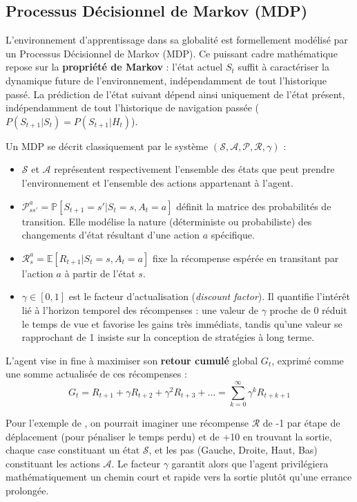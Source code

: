 \subsection{Processus Décisionnel de Markov (MDP)}
\label{sec:mdp}

L'environnement d'apprentissage dans sa globalité est formellement modélisé par un Processus Décisionnel de Markov (MDP). Ce puissant cadre mathématique repose sur la \textbf{propriété de Markov} : l'état actuel $S_t$ suffit à caractériser la dynamique future de l'environnement, indépendamment de tout l'historique passé. La prédiction de l'état suivant dépend ainsi uniquement de l'état présent, indépendamment de tout l'historique de navigation passée ($P(S_{t+1}|S_t) = P(S_{t+1}|H_t)$).

Un MDP se décrit classiquement par le système $(\mathcal{S}, \mathcal{A}, \mathcal{P}, \mathcal{R}, \gamma)$ :
\begin{itemize}
    \item $\mathcal{S}$ et $\mathcal{A}$ représentent respectivement l'ensemble des états que peut prendre l'environnement et l'ensemble des actions appartenant à l'agent.
    \item $\mathcal{P}_{ss'}^a = \mathbb{P}[S_{t+1}=s' | S_t=s, A_t=a]$ définit la matrice des probabilités de transition. Elle modélise la nature (déterministe ou probabiliste) des changements d'état résultant d'une action $a$ spécifique.
    \item $\mathcal{R}_s^a = \mathbb{E}[R_{t+1} | S_t=s, A_t=a]$ fixe la récompense espérée en transitant par l'action $a$ à partir de l'état $s$.
    \item $\gamma \in [0, 1]$ est le facteur d'actualisation (\textit{discount factor}). Il quantifie l'intérêt lié à l'horizon temporel des récompenses : une valeur de $\gamma$ proche de 0 réduit le temps de vue et favorise les gains très immédiats, tandis qu'une valeur se rapprochant de 1 insiste sur la conception de stratégies à long terme.
\end{itemize}

L'agent vise in fine à maximiser son \textbf{retour cumulé} global $G_t$, exprimé comme une somme actualisée de ces récompenses :
\begin{equation}
    G_t = R_{t+1} + \gamma R_{t+2} + \gamma^2 R_{t+3} + \dots = \sum_{k=0}^{\infty} \gamma^k R_{t+k+1}
    \label{eq:return}
\end{equation}

Pour l'exemple de , on pourrait imaginer une récompense $\mathcal{R}$ de -1 par étape de déplacement (pour pénaliser le temps perdu) et de +10 en trouvant la sortie, chaque case constituant un état $\mathcal{S}$, et les pas (Gauche, Droite, Haut, Bas) constituant les actions $\mathcal{A}$. Le facteur $\gamma$ garantit alors que l'agent privilégiera mathématiquement un chemin court et rapide vers la sortie plutôt qu'une errance prolongée.


